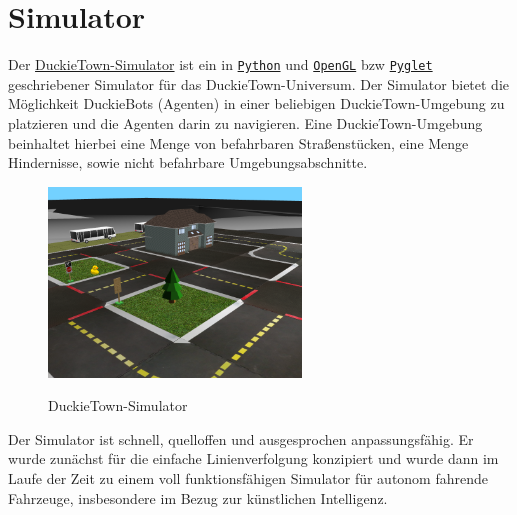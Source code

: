 \section{Simulator}

Der \href{https://github.com/duckietown/gym-duckietown}{DuckieTown-Simulator} ist ein in \href{https://www.python.org/}{\texttt{Python}} und \href{https://www.opengl.org/}{\texttt{OpenGL}} \acf{bzw} \href{http://pyglet.org/}{\texttt{Pyglet}} geschriebener Simulator für das \glqq DuckieTown-Universum\grqq. Der Simulator bietet die Möglichkeit DuckieBots (Agenten) in einer beliebigen DuckieTown-Umgebung zu platzieren und die Agenten darin zu navigieren. Eine DuckieTown-Umgebung beinhaltet hierbei eine Menge von befahrbaren Straßenstücken, eine Menge Hindernisse, sowie nicht befahrbare Umgebungsabschnitte. \cite{gym_duckietown} \\

\begin{figure}[H]
	\centering
	\includegraphics[width=0.6\textwidth]{kapitel2/images/duckietown-gym.png}
	\label{fig:duckietown-gym}
	\caption{DuckieTown-Simulator}
\end{figure}

Der Simulator ist schnell, quelloffen und ausgesprochen anpassungsfähig. Er wurde zunächst für die einfache Linienverfolgung konzipiert und wurde dann im Laufe der Zeit zu einem voll funktionsfähigen Simulator für autonom fahrende Fahrzeuge, insbesondere im Bezug zur künstlichen Intelligenz. \cite{gym_duckietown}

